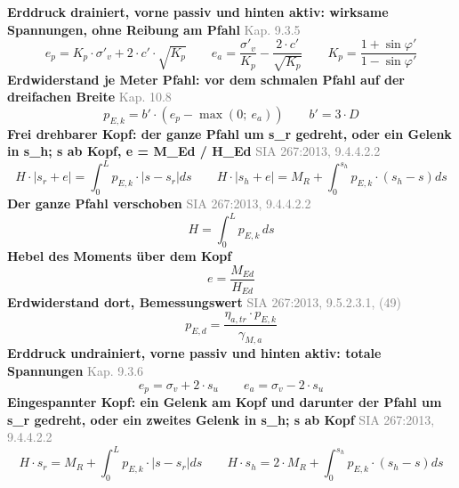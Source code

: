\documentclass[11pt,a4paper]{article}
\newcommand{\normref}[1]{{\small\textcolor{gray}{#1}}}
\begin{document}
\noindent\textbf{Erddruck drainiert, vorne passiv und hinten aktiv: wirksame Spannungen, ohne Reibung am Pfahl} \hfill \normref{Kap. 9.3.5}
\begin{equation*}
e_p = K_p \cdot \sigma'_v + 2 \cdot c' \cdot \sqrt{K_p} \qquad e_a = \frac{\sigma'_v}{K_p} - \frac{2 \cdot c'}{\sqrt{K_p}} \qquad K_p = \frac{1 + \sin\varphi'}{1 - \sin\varphi'}
\end{equation*}
\noindent\textbf{Erdwiderstand je Meter Pfahl: vor dem schmalen Pfahl auf der dreifachen Breite} \hfill \normref{Kap. 10.8}
\begin{equation*}
p_{E,k} = b' \cdot \left(e_p - \max\left(0;\ e_a\right)\right) \qquad b' = 3 \cdot D
\end{equation*}
\noindent\textbf{Frei drehbarer Kopf: der ganze Pfahl um s\_r gedreht, oder ein Gelenk in s\_h; s ab Kopf, e = M\_Ed / H\_Ed} \hfill \normref{SIA 267:2013, 9.4.4.2.2}
\begin{equation*}
H \cdot \left|s_r + e\right| = \int_0^L p_{E,k} \cdot \left|s - s_r\right| ds \qquad H \cdot \left|s_h + e\right| = M_R + \int_0^{s_h} p_{E,k} \cdot \left(s_h - s\right) ds
\end{equation*}
\noindent\textbf{Der ganze Pfahl verschoben} \hfill \normref{SIA 267:2013, 9.4.4.2.2}
\begin{equation*}
H = \int_0^L p_{E,k}\, ds
\end{equation*}
\noindent\textbf{Hebel des Moments über dem Kopf}
\begin{equation*}
e = \frac{M_{Ed}}{H_{Ed}}
\end{equation*}
\noindent\textbf{Erdwiderstand dort, Bemessungswert} \hfill \normref{SIA 267:2013, 9.5.2.3.1, (49)}
\begin{equation*}
p_{E,d} = \frac{\eta_{a,tr} \cdot p_{E,k}}{\gamma_{M,a}}
\end{equation*}
\noindent\textbf{Erddruck undrainiert, vorne passiv und hinten aktiv: totale Spannungen} \hfill \normref{Kap. 9.3.6}
\begin{equation*}
e_p = \sigma_v + 2 \cdot s_u \qquad e_a = \sigma_v - 2 \cdot s_u
\end{equation*}
\noindent\textbf{Eingespannter Kopf: ein Gelenk am Kopf und darunter der Pfahl um s\_r gedreht, oder ein zweites Gelenk in s\_h; s ab Kopf} \hfill \normref{SIA 267:2013, 9.4.4.2.2}
\begin{equation*}
H \cdot s_r = M_R + \int_0^L p_{E,k} \cdot \left|s - s_r\right| ds \qquad H \cdot s_h = 2 \cdot M_R + \int_0^{s_h} p_{E,k} \cdot \left(s_h - s\right) ds
\end{equation*}
\end{document}

